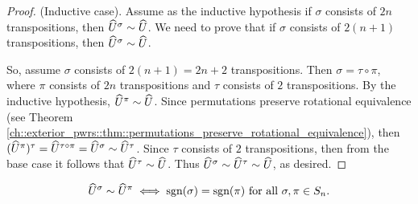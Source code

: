 \begin{proof}
    (Inductive case). Assume as the inductive hypothesis if $\sigma$ consists of $2n$ transpositions, then $\widehat{U}^\sigma \sim \widehat{U}$. We need to prove that if $\sigma$ consists of $2(n + 1)$ transpositions, then $\widehat{U}^\sigma \sim \widehat{U}$.

    So, assume $\sigma$ consists of $2(n + 1) = 2n + 2$ transpositions. Then $\sigma = \tau \circ \pi$, where $\pi$ consists of $2n$ transpositions and $\tau$ consists of $2$ transpositions. By the inductive hypothesis, $\widehat{U}^\pi \sim \widehat{U}$. Since permutations preserve rotational equivalence (see Theorem \ref{ch::exterior_pwrs::thm::permutations_preserve_rotational_equivalence}), then $(\widehat{U}^\pi)^\tau = \widehat{U}^{\tau \circ \pi} = \widehat{U}^\sigma \sim \widehat{U}^\tau$. Since $\tau$ consists of $2$ transpositions, then from the base case it follows that $\widehat{U}^\tau \sim \widehat{U}$. Thus $\widehat{U}^\sigma \sim \widehat{U}^\tau \sim \widehat{U}$, as desired.
\end{proof}

\begin{theorem}
    \begin{align*}
        \widehat{U}^\sigma \sim \widehat{U}^\pi \iff \text{sgn}(\sigma) = \text{sgn}(\pi) \text{ for all $\sigma, \pi \in S_n$}.
    \end{align*}
\end{theorem}

